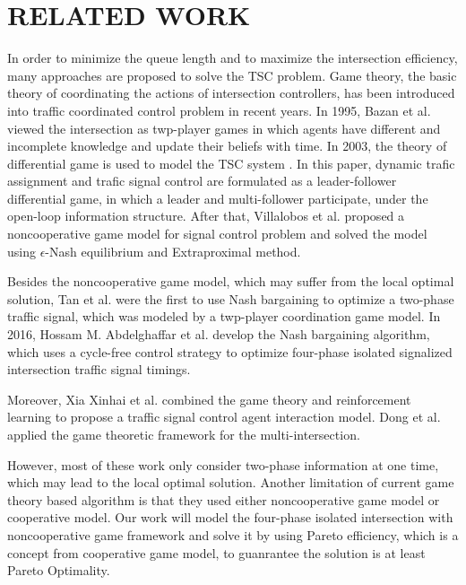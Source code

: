 \documentclass[a4paper, 10pt, conference]{ieeeconf}      %
\begin{document}
\section{RELATED WORK}

In order to minimize the queue length and to maximize the intersection efficiency, many approaches are proposed to solve the TSC problem. 
Game theory, the basic theory of coordinating the actions of intersection controllers, has been introduced into traffic coordinated
control problem in recent years. In 1995, Bazan et al. \cite{bazan1995game} viewed the intersection as twp-player games in which 
agents have different and incomplete knowledge and update their beliefs with time. 
In 2003, the theory of differential game is used to model the TSC system \cite{zhen2003differential}. 
In this paper, dynamic trafic assignment and trafic signal control are formulated as a leader-follower differential game, in which a leader and
multi-follower participate, under the open-loop information structure. After that, Villalobos et al. \cite{villalobos2008urban} proposed a 
noncooperative game model for signal control problem and solved the model using $\epsilon$-Nash equilibrium and Extraproximal method. 

Besides the noncooperative game model, which may suffer from the local optimal solution, 
Tan et al. \cite{linglong2010study} were the first to use Nash bargaining to optimize a two-phase traffic 
signal, which was modeled by a twp-player coordination game model. In 2016, Hossam M. Abdelghaffar et al. \cite{abdelghaffar2016isolated} develop 
the Nash bargaining algorithm, which uses a cycle-free control strategy to optimize four-phase isolated signalized intersection traffic signal timings. 

Moreover, Xia Xinhai et al. \cite{xinhai2009traffic} combined the game theory and reinforcement learning to propose a traffic signal control agent 
interaction model. Dong et al. \cite{dong2011multi} \cite{dai2013multi} applied the game theoretic framework for the multi-intersection. 

However, most of these work only consider two-phase information at one time, which may lead to the local optimal solution. Another limitation of 
current game theory based algorithm is that they used either noncooperative game model or cooperative model. Our work will model the four-phase
isolated intersection with noncooperative game framework and solve it by using Pareto efficiency, which is a concept from cooperative game model, to 
guanrantee the solution is at least Pareto Optimality.
\end{document}
